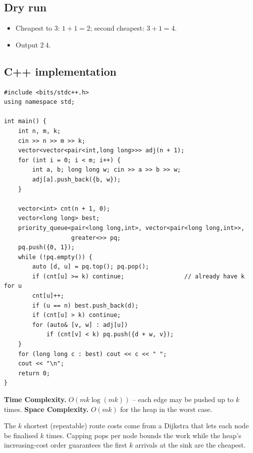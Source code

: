 \subsection*{Dry run}


\begin{itemize}
  \item Cheapest to $3$: $1{+}1=2$; second cheapest: $3{+}1=4$.
  \item Output $2\ 4$.
\end{itemize}

\subsection*{C++ implementation}

\begin{lstlisting}
#include <bits/stdc++.h>
using namespace std;

int main() {
    int n, m, k;
    cin >> n >> m >> k;
    vector<vector<pair<int,long long>>> adj(n + 1);
    for (int i = 0; i < m; i++) {
        int a, b; long long w; cin >> a >> b >> w;
        adj[a].push_back({b, w});
    }

    vector<int> cnt(n + 1, 0);
    vector<long long> best;
    priority_queue<pair<long long,int>, vector<pair<long long,int>>,
                   greater<>> pq;
    pq.push({0, 1});
    while (!pq.empty()) {
        auto [d, u] = pq.top(); pq.pop();
        if (cnt[u] >= k) continue;                 // already have k for u
        cnt[u]++;
        if (u == n) best.push_back(d);
        if (cnt[u] > k) continue;
        for (auto& [v, w] : adj[u])
            if (cnt[v] < k) pq.push({d + w, v});
    }
    for (long long c : best) cout << c << " ";
    cout << "\n";
    return 0;
}
\end{lstlisting}

\begin{complexitybox}
\textbf{Time Complexity.} $O(mk\log(mk))$ -- each edge may be pushed up to
$k$ times. \textbf{Space Complexity.} $O(mk)$ for the heap in the worst
case.
\end{complexitybox}

\begin{takeawaybox}
The $k$ shortest (repeatable) route costs come from a Dijkstra that lets
each node be finalised $k$ times. Capping pops per node bounds the work
while the heap's increasing-cost order guarantees the first $k$ arrivals at
the sink are the cheapest.
\end{takeawaybox}

